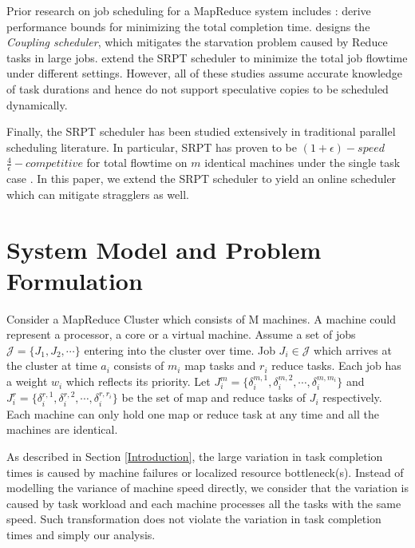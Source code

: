 \documentclass[10pt,conference,compsocconf,letterpaper]{IEEEtran}
\begin{document}
Prior research on job scheduling for a MapReduce system includes \cite{Fast_completion,Flow_Shops,Joint_Phase,Delay_Tails,Joing_scheduling,overlapping_phases,Schedulers}:\cite{Fast_completion,Joing_scheduling,Joint_Phase}
derive performance bounds for minimizing the total completion time. \cite{Delay_Tails} designs the \textit{Coupling scheduler}, which mitigates the starvation problem caused by Reduce tasks in large jobs. \cite{Flow_Shops,Schedulers,Joing_scheduling} extend the SRPT scheduler to minimize the total job flowtime under different settings. However, all of these studies assume accurate knowledge of task durations and hence do not support speculative copies to be scheduled dynamically.

Finally, the SRPT scheduler has been studied extensively in traditional parallel scheduling literature.
In particular, SRPT has proven to be $(1+\epsilon)-speed$ $\frac{4}{\epsilon}-competitive$ for total flowtime on $m$ identical machines under the single task case \cite{SRPT}.
In this paper, we extend the SRPT scheduler to yield an online scheduler which can mitigate stragglers as well.


\section{System Model and Problem Formulation}
\label{system_model}
Consider a MapReduce Cluster which consists of M machines. A machine could represent a processor, a core or a virtual machine. Assume a set of jobs  $\mathcal{J} = \{J_1, J_2, \cdots\}$ entering into the cluster over time. Job $J_i \in \mathcal{J}$ which arrives at the cluster at time $a_i$ consists of $m_i$ map tasks and $r_i$ reduce tasks. Each job has a weight $w_i$ which reflects its priority. Let $J_i^m = \{\delta_i^{m,1},\delta_i^{m,2},\cdots,\delta_i^{m,m_i}\}$ and $J_i^r = \{\delta_i^{r,1},\delta_i^{r,2},\cdots,\delta_i^{r,r_i}\}$ be the set of map and reduce tasks of $J_i$ respectively. Each machine can only hold one map or reduce task at any time and all the machines are identical.

As described in Section \ref{Introduction}, the large variation in task completion times is caused by machine failures or localized resource bottleneck(s). Instead of modelling the variance of machine speed directly, we consider that the variation is caused by task workload and each machine processes all the tasks with the same speed. Such transformation does not violate the variation in task completion times and simply our analysis.
\end{document}
